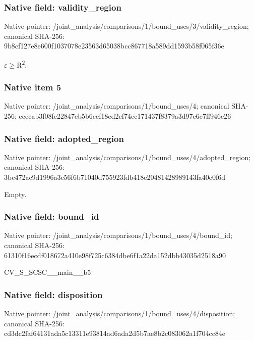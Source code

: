 \documentclass[10pt,a4paper]{article}
\begin{document}
\subsubsection{Native field: validity\_region}


Native pointer: /joint\_analysis/comparis\allowbreak{}ons/1/bound\_uses/3/valid\allowbreak{}ity\_region; canonical SHA-256: 9b8cf127e8e600f1037078e2\allowbreak{}3563d65038bcc867718a589d\allowbreak{}d1593b58f065f36e


\ensuremath{\varepsilon}\ensuremath{\ge}R\textsuperscript{2}.


\subsubsection{Native item 5}


Native pointer: /joint\_analysis/comparis\allowbreak{}ons/1/bound\_uses/4; canonical SHA-256: ececab3f08fe22847eb5b6ce\allowbreak{}f18ed2cf74ec171437f8379a\allowbreak{}3d97c6e7ff946e26



\subsubsection{Native field: adopted\_region}


Native pointer: /joint\_analysis/comparis\allowbreak{}ons/1/bound\_uses/4/adopt\allowbreak{}ed\_region; canonical SHA-256: 3bc472ac9d1996a3c56f6b71\allowbreak{}040d755923fdb418e2048142\allowbreak{}8989143fa40e0f6d


Empty.


\subsubsection{Native field: bound\_id}


Native pointer: /joint\_analysis/comparis\allowbreak{}ons/1/bound\_uses/4/bound\allowbreak{}\_id; canonical SHA-256: 61310f16ecdf018672a410e9\allowbreak{}8f725c6384dbe6f1a22da152\allowbreak{}dbb43035d2518a90


CV\_S\_SCSC\_\_main\_\_b5


\subsubsection{Native field: disposition}


Native pointer: /joint\_analysis/comparis\allowbreak{}ons/1/bound\_uses/4/dispo\allowbreak{}sition; canonical SHA-256: cd3dc2faf64131ada5c13311\allowbreak{}e93814ad6ada2d5b7ae8b2c0\allowbreak{}83062a1f704cc84e
\end{document}
